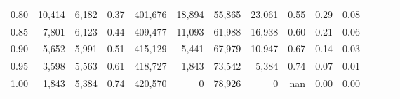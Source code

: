 \begin{tabular}{rrrrrrrrrrrrrr}
0.80 &  10,414 &  6,182 &  0.37 &  401,676 &   18,894 &  55,865 &  23,061 &  0.55 &  0.29 &      0.08 \\
0.85 &   7,801 &  6,123 &  0.44 &  409,477 &   11,093 &  61,988 &  16,938 &  0.60 &  0.21 &      0.06 \\
0.90 &   5,652 &  5,991 &  0.51 &  415,129 &    5,441 &  67,979 &  10,947 &  0.67 &  0.14 &      0.03 \\
0.95 &   3,598 &  5,563 &  0.61 &  418,727 &    1,843 &  73,542 &   5,384 &  0.74 &  0.07 &      0.01 \\
1.00 &   1,843 &  5,384 &  0.74 &  420,570 &        0 &  78,926 &       0 &   nan &  0.00 &      0.00 \\
\bottomrule
\end{tabular}
